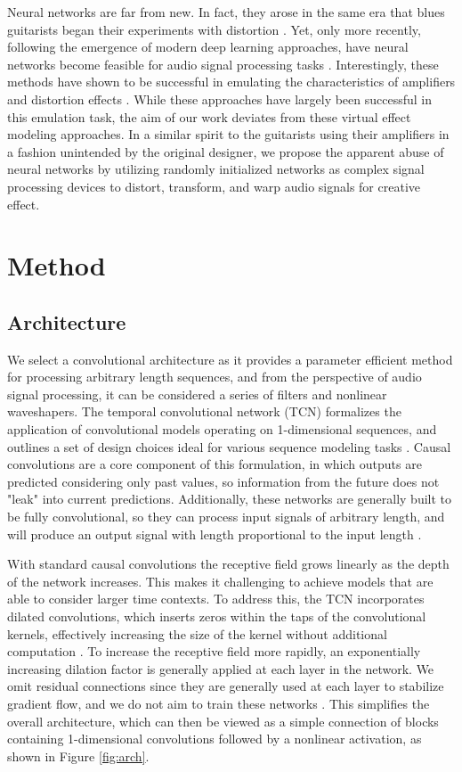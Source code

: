 \documentclass{article}
\begin{document}
Neural networks are far from new. 
In fact, they arose in the same era that blues guitarists began their experiments with distortion \cite{schmidhuber2015deep}.
Yet, only more recently, following the emergence of modern deep learning approaches, 
have neural networks become feasible for audio signal processing tasks \cite{purwins2019deep}.
Interestingly, these methods have shown to be successful in emulating the characteristics of amplifiers and distortion effects 
\cite{schmitz2018nonlinear, zhang2018lstm, damskagg2019distortion, martinez2019nonlinear}.
While these approaches have largely been successful in this emulation task, the aim of our work deviates from these virtual effect modeling approaches.
In a similar spirit to the guitarists using their amplifiers in a fashion unintended by the original designer,
we propose the apparent abuse of neural networks by utilizing randomly initialized networks as complex signal processing devices
to distort, transform, and warp audio signals for creative effect. 

\section{Method}
\subsection{Architecture}

We select a convolutional architecture as it provides a parameter efficient method for processing arbitrary length sequences, 
and from the perspective of audio signal processing, it can be considered a series of filters and nonlinear waveshapers.
The temporal convolutional network (TCN) formalizes the application of convolutional models operating on 1-dimensional sequences,
and outlines a set of design choices ideal for various sequence modeling tasks \cite{bai2018tcn}. 
Causal convolutions are a core component of this formulation, in which outputs are predicted considering only past values,
so information from the future does not "leak" into current predictions. 
Additionally, these networks are generally built to be fully convolutional, 
so they can process input signals of arbitrary length, and will produce an output signal with length proportional to the input length \cite{long2015fcn}.

With standard causal convolutions the receptive field grows linearly as the depth of the network increases. 
This makes it challenging to achieve models that are able to consider larger time contexts. 
To address this, the TCN incorporates dilated convolutions, which inserts zeros within the taps of the convolutional kernels, 
effectively increasing the size of the kernel without additional computation \cite{oord2016wavenet}. 
To increase the receptive field more rapidly, an exponentially increasing dilation factor is generally applied at each layer in the network. 
We omit residual connections since they are generally used at each layer to stabilize gradient flow, and we do not aim to train these networks \cite{he2016deep}.
This simplifies the overall architecture, which can then be viewed as a simple connection of blocks containing
1-dimensional convolutions followed by a nonlinear activation, as shown in Figure \ref{fig:arch}. 
\end{document}
